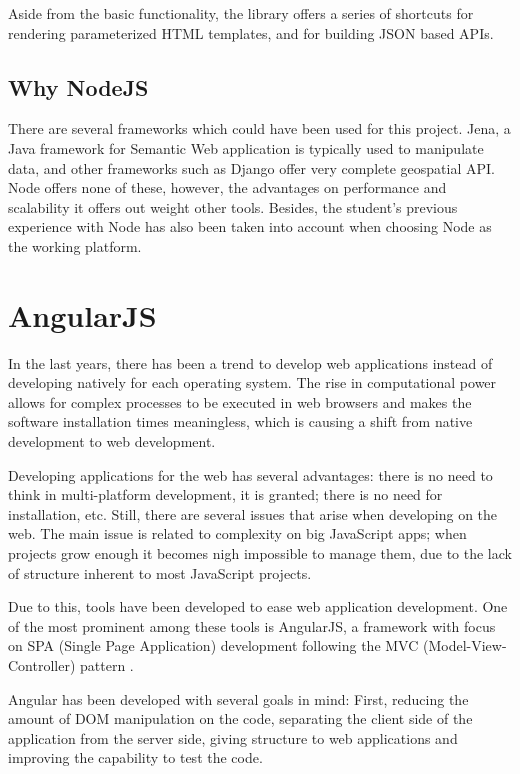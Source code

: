 Aside from the basic functionality, the library offers a series of shortcuts for rendering parameterized HTML templates, and for building JSON based APIs.

\subsection*{Why NodeJS}

There are several frameworks which could have been used for this project. Jena, a Java framework for Semantic Web application is typically used to manipulate data, and other frameworks such as Django offer very complete geospatial API. Node offers none of these, however, the advantages on performance and scalability it offers out weight other tools. Besides, the student's previous experience with Node has also been taken into account when choosing Node as the working platform.
 
\section*{AngularJS}

In the last years, there has been a trend to develop web applications instead of developing natively for each operating system. The rise in computational power allows for complex processes to be executed in web browsers and makes the software installation times meaningless, which is causing a shift from native development to web development.

Developing applications for the web has several advantages: there is no need to think in multi-platform development, it is granted; there is no need for installation, etc. Still, there are several issues that arise when developing on the web. The main issue is related to complexity on big JavaScript apps; when projects grow enough it becomes nigh impossible to manage them, due to the lack of structure inherent to most JavaScript projects.

Due to this, tools have been developed to ease web application development. One of the most prominent among these tools is AngularJS, a framework with focus on SPA (Single Page Application) development following the MVC (Model-View-Controller) pattern \cite{angularjs1, angularjs2}.

Angular has been developed with several goals in mind: First, reducing the amount of DOM manipulation on the code, separating the client side of the application from the server side, giving structure to web applications and improving the capability to test the code.

